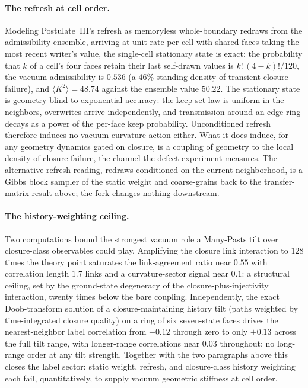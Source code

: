 \documentclass[11pt]{article}
\begin{document}
\paragraph{The refresh at cell order.} Modeling Postulate~III's refresh as memoryless whole-boundary redraws from the admissibility ensemble, arriving at unit rate per cell with shared faces taking the most recent writer's value, the single-cell stationary state is exact: the probability that $k$ of a cell's four faces retain their last self-drawn values is $k!\,(4-k)!/120$, the vacuum admissibility is $0.536$ (a $46\%$ standing density of transient closure failure), and $\langle K^2\rangle=48.74$ against the ensemble value $50.22$. The stationary state is geometry-blind to exponential accuracy: the keep-set law is uniform in the neighbors, overwrites arrive independently, and transmission around an edge ring decays as a power of the per-face keep probability. Unconditioned refresh therefore induces no vacuum curvature action either. What it does induce, for any geometry dynamics gated on closure, is a coupling of geometry to the local density of closure failure, the channel the defect experiment measures. The alternative refresh reading, redraws conditioned on the current neighborhood, is a Gibbs block sampler of the static weight and coarse-grains back to the transfer-matrix result above; the fork changes nothing downstream.

\paragraph{The history-weighting ceiling.} Two computations bound the strongest vacuum role a Many-Pasts tilt over closure-class observables could play. Amplifying the closure link interaction to $128$ times the theory point saturates the link-agreement ratio near $0.55$ with correlation length $1.7$ links and a curvature-sector signal near $0.1$: a structural ceiling, set by the ground-state degeneracy of the closure-plus-injectivity interaction, twenty times below the bare coupling. Independently, the exact Doob-transform solution of a closure-maintaining history tilt (paths weighted by time-integrated closure quality) on a ring of six seven-state faces drives the nearest-neighbor label correlation from $-0.12$ through zero to only $+0.13$ across the full tilt range, with longer-range correlations near $0.03$ throughout: no long-range order at any tilt strength. Together with the two paragraphs above this closes the label sector: static weight, refresh, and closure-class history weighting each fail, quantitatively, to supply vacuum geometric stiffness at cell order.
\end{document}
